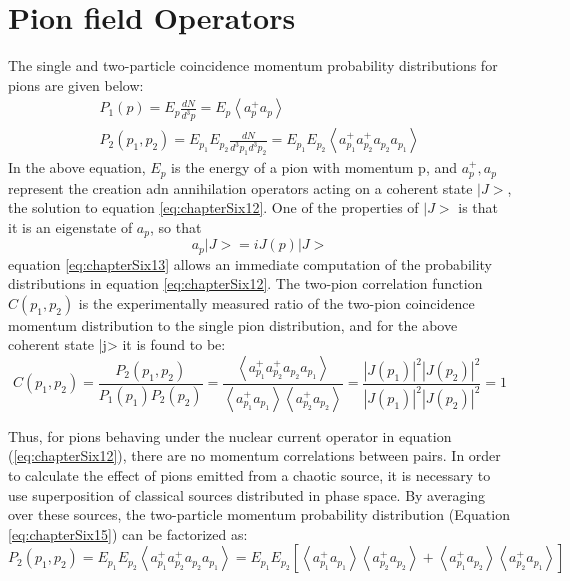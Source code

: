\section{Pion field Operators}
The single and two-particle coincidence momentum probability distributions for pions are given below:
\begin{gather}
  \label{eq:chapterSix15}
  P_{1}(p) = E_{p}\frac{dN}{d^{3}p} = E_{p}\left<a_{p}^{+}a_{p}\right> \\
  P_{2}(p_{1}, p_{2}) = E_{p_{1}}E_{p_{2}}\frac{dN}{d^{3}p_{1}d^{3}p_{2}} = E_{p_{1}}E_{p_{2}}\left<a_{p_{1}}^{+}a_{p_{2}}^{+}a_{p_{2}}a_{p_{1}}\right>
\end{gather}
In the above equation, $E_{p}$ is the energy of a pion with momentum p,%
and $a_{p}^{+}, a_{p}$ represent the creation adn annihilation operators acting on a coherent state $|J>$,%
the solution to equation \ref{eq:chapterSix12}.%
One of the properties of $|J>$ is that it is an eigenstate of $a_{p}$,%
so that
\begin{equation}
  \label{eq:chapterSix13}
  a_{p}|J> = iJ(p)|J>
\end{equation}
equation \ref{eq:chapterSix13} allows an immediate computation of the probability distributions in equation
\ref{eq:chapterSix12}. %
The two-pion correlation function $C(p_{1}, p_{2})$ is the experimentally measured ratio of the two-pion coincidence momentum distribution to the single pion distribution,%
and for the above coherent state |j> it is found to be:
\begin{equation}
  \label{eq:chapterSix14}
  C(p_{1}, p_{2}) = \frac{P_{2}(p_{1}, p_{2})}{P_{1}(p_{1})P_{2}(p_{2})} = \frac{\left< a_{p_{1}}^{+}a_{p_{2}}^{+}a_{p_{2}}a_{p_{1}}\right>}{\left<a_{p_{1}}^{+}a_{p_{1}}\right>\left<a_{p_{2}}^{+}a_{p_{2}}\right>} = \frac{|J(p_{1})|^{2}|J(p_{2})|^{2}}{|J(p_{1})|^{2}|J(p_{2})|^{2}} = 1
\end{equation}
\par
Thus, for pions behaving under the nuclear current operator in equation (\ref{eq:chapterSix12}),%
there are no momentum correlations between pairs.%
In order to calculate the effect of pions emitted from a chaotic source,%
it is necessary to use superposition of classical sources distributed in phase space.%
By averaging over these sources, the two-particle momentum probability distribution (Equation \ref{eq:chapterSix15}) can be factorized as:
\begin{equation}
  \label{eq:chapterSix16}
  P_{2}(p_{1}, p_{2}) = E_{p_{1}}E_{p_{2}}\left<a_{p_{1}}^{+}a_{p_{2}}^{+}a_{p_{2}}a_{p_{1}}\right> = E_{p_{1}}E_{p_{2}}\left[\left<a_{p_{1}}^{+}a_{p_{1}}\right> \left<a_{p_{2}}^{+}a_{p_{2}}\right> + \left<a_{p_{1}}^{+}a_{p_{2}}\right> \left<a_{p_{2}}^{+}a_{p_{1}}\right> \right]
\end{equation}
